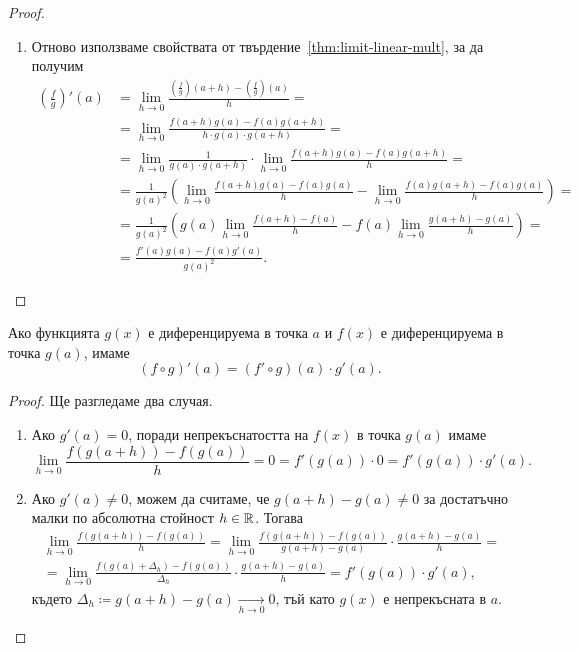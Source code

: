 \documentclass[numbers=endperiod, DIV=15, bibliography=totocnumbered]{scrartcl}
\begin{document}
\begin{proof}
\begin{enumerate}
    \item Отново използваме свойствата от твърдение~\ref{thm:limit-linear-mult}, за да получим
    \begin{align*}
      \left( \frac f g \right)'(a)
      &=
      \lim_{h \to 0} \frac {\left(\frac f g \right)(a+h) - \left(\frac f g \right)(a)} h
      = \\ &=
      \lim_{h \to 0} \frac {f(a+h) g(a) - f(a) g(a+h)} {h \cdot g(a) \cdot g(a+h)}
      = \\ &=
      \lim_{h \to 0} \frac 1 {g(a) \cdot g(a+h)} \cdot \lim_{h \to 0} \frac {f(a+h) g(a) - f(a) g(a+h)} h
      = \\ &=
      \frac 1 {{g(a)}^2} \left( \lim_{h \to 0} \frac {f(a+h) g(a) - f(a) g(a)} h - \lim_{h \to 0} \frac {f(a) g(a+h) - f(a) g(a)} h \right)
      = \\ &=
      \frac 1 {{g(a)}^2} \left( g(a) \lim_{h \to 0} \frac {f(a+h) - f(a)} h - f(a) \lim_{h \to 0} \frac {g(a+h) - g(a)} h \right)
      = \\ &=
      \frac {f'(a) g(a) - f(a) g'(a)} {{g(a)}^2}.
    \end{align*}
  \end{enumerate}
\end{proof}

\begin{theorem}\label{thm:chain-rule}
  Ако функцията $g(x)$ е диференцируема в точка $a$ и $f(x)$ е диференцируема в точка $g(a)$, имаме
  \begin{displaymath}
    (f \circ g)'(a) = (f' \circ g)(a) \cdot g'(a).
  \end{displaymath}
\end{theorem}
\begin{proof}
  Ще разгледаме два случая.

  \begin{enumerate}
    \item Ако $g'(a) = 0$, поради непрекъснатостта на $f(x)$ в точка $g(a)$ имаме
    \begin{displaymath}
      \lim_{h \to 0} \frac {f(g(a+h)) - f(g(a))} h
      =
      0
      =
      f'(g(a)) \cdot 0
      =
      f'(g(a)) \cdot g'(a).
    \end{displaymath}

    \item Ако $g'(a) \neq 0$, можем да считаме, че $g(a+h) - g(a) \neq 0$ за достатъчно малки по абсолютна стойност $h \in \mathbb{R}$. Тогава
    \begin{multline*}
      \lim_{h \to 0} \frac {f(g(a+h)) - f(g(a))} h
      =
      \lim_{h \to 0} \frac {f(g(a+h)) - f(g(a))} {g(a+h) - g(a)} \cdot \frac {g(a+h) - g(a)} h
      = \\ =
      \lim_{h \to 0} \frac {f(g(a) + \Delta_h) - f(g(a))} {\Delta_h} \cdot \frac {g(a+h) - g(a)} h
      =
      f'(g(a)) \cdot g'(a),
    \end{multline*}
    където $\Delta_h \coloneqq g(a+h) - g(a) \underset {h \to 0} \longrightarrow 0$, тъй като $g(x)$ е непрекъсната в $a$.
  \end{enumerate}
\end{proof}
\end{document}
